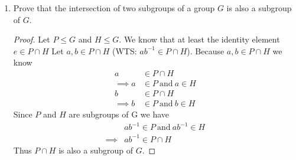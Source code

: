 \documentclass[12pt]{article}
\newcommand\setitemnumber[1]{\setcounter{enumi}{\numexpr#1-1\relax}}
\begin{document}
\begin{enumerate}[label=\textbf{\arabic*}.]
\begin{proof}
            $\therefore$ by the 2 step test $G$ is a subgroup of $\mathbb{R}^*$ under the operation of multiplication.
	      \end{proof}
          \pagebreak
    \setitemnumber{45}
    \item Prove that the intersection of two subgroups of a group $G$ is also a subgroup of $G$.
          \begin{proof} Let $P \leq G$ and $H \leq G$. We know that at least the identity element $e \in P \cap H$ Let $a,b \in P \cap H$
            (WTS\@: $ab^{-1} \in P \cap H$). Because $a,b \in P \cap H$ we know
            \begin{align*}
                a &\in P \cap H \\
                \implies a &\in P \ \text{and} \ a \in H \\
                b &\in P \cap H \\
                \implies b &\in P \ \text{and} \ b \in H
            \end{align*}
            Since $P$ and $H$ are subgroups of G we have
            \begin{align*}
                &ab^{-1} \in P \ \text{and} \ ab^{-1} \in H \\
                \implies &ab^{-1} \in P \cap H
            \end{align*}
            Thus $P \cap H$ is also a subgroup of $G$.
          \end{proof}
\end{enumerate}
\end{document}
